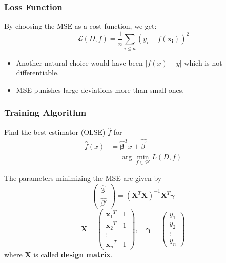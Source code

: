 \subsubsection{Loss Function}
By choosing the MSE as a cost function, we get:
\begin{equation*}
    \mathcal{L}(D,f)=\frac{1}{n}\sum_{i\leq n}{\left(y_i-f(\mathbf{x_i})\right)}^2
\end{equation*}

\begin{itemize}
    \item Another natural choice would have been $|f(x)-y|$ which is not differentiable.
    \item MSE punishes large deviations more than small ones.
\end{itemize}

\subsubsection{Training Algorithm}
Find the best estimator (OLSE) $\widehat{f}$ for
\begin{align*}
    \widehat{f}(x) & =\widehat{\boldsymbol{\beta}}^T x+\widehat{\beta^{\prime}} \\
               & =\arg\min_{f\in\mathcal{H}}L(D,f)
\end{align*}


The parameters minimizing the MSE are given by
\begin{equation*}
    \begin{pmatrix}
        \widehat{\boldsymbol{\beta}} \\
        \widehat{\beta'}
    \end{pmatrix}
    ={(\mathbf{X}^T \mathbf{X})}^{-1}\mathbf{X}^T\boldsymbol{\gamma}
\end{equation*}
\begin{equation*}
    \mathbf{X}=
    \begin{pmatrix}
        {\mathbf{x}_1}^T & 1 \\
        {\mathbf{x}_2}^T & 1 \\
        \vdots               \\
        {\mathbf{x}_n}^T & 1
    \end{pmatrix},\quad
    \boldsymbol{\gamma}=
    \begin{pmatrix}
        y_1    \\
        y_2    \\
        \vdots \\
        y_n
    \end{pmatrix}
\end{equation*}
where $\mathbf{X}$ is called \textbf{design matrix}.

